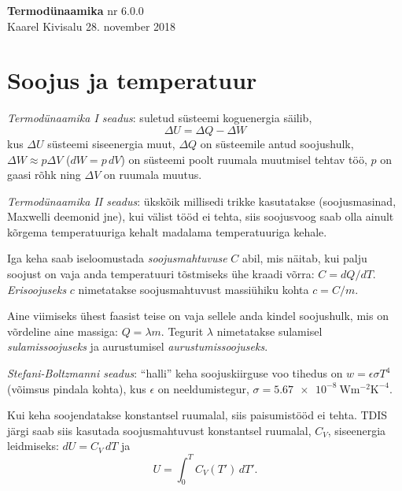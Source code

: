 \documentclass[a4paper,11pt,twocolumn]{article}
\begin{document}
{\huge \textbf{Termodünaamika} \hfill \normalsize {nr 6.0.0}} \\
{Kaarel Kivisalu \hfill 28. november 2018}

\section{Soojus ja temperatuur}
\textit{Termodünaamika I seadus}: suletud süsteemi koguenergia säilib, 
\[ \Delta U=\Delta Q-\Delta W\]
kus \( \Delta U \) süsteemi siseenergia muut, \( \Delta Q \) on süsteemile antud
soojushulk, \( \Delta W \approx p\Delta V \) (\( dW=p\,dV \)) on süsteemi poolt ruumala muutmisel tehtav töö, \( p \) on gaasi rõhk ning \( \Delta V \) on ruumala muutus.

\textit{Termodünaamika II seadus}: ükskõik millisedi trikke kasutatakse (soojusmasinad, Maxwelli deemonid jne), kui välist tööd ei tehta, siis soojusvoog saab olla ainult kõrgema temperatuuriga kehalt madalama temperatuuriga kehale.

Iga keha saab iseloomustada \textit{soojusmahtuvuse} \( C \) abil,
mis näitab, kui palju soojust on vaja anda temperatuuri tõstmiseks ühe kraadi võrra: \( C = dQ/dT \). \textit{Erisoojuseks} \( c \) nimetatakse soojusmahtuvust massiühiku kohta \( c=C/m \).

Aine viimiseks ühest faasist teise on vaja sellele anda kindel soojushulk, mis on võrdeline aine massiga: \( Q=\lambda m \). Tegurit \( \lambda \) nimetatakse sulamisel \textit{sulamissoojuseks} ja aurustumisel \textit{aurustumissoojuseks}.

\textit{Stefani-Boltzmanni seadus}: \enquote{halli} keha soojuskiirguse voo tihedus on \( w=\epsilon\sigma T^4 \) (võimsus pindala kohta), kus \( \epsilon \) on neeldumistegur, \( \sigma = \SI{5,67e-8}{\watt\metre\tothe{-2}\kelvin\tothe{-4}} \).

Kui keha soojendatakse konstantsel ruumalal, siis paisumistööd ei tehta. TDIS järgi saab siis kasutada soojusmahtuvust konstantsel ruumalal, \( C_V \), siseenergia leidmiseks: \( dU=C_V\,dT \) ja \[ U=\int_{0}^{T}C_V(T')\, dT' .\]
\end{document}
